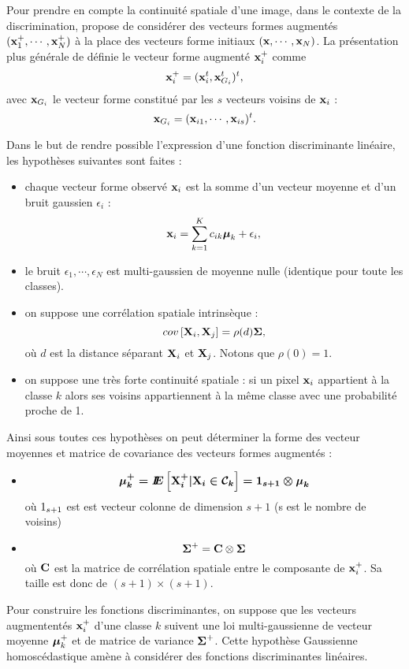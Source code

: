 %
%
%

Pour prendre en compte la continuit\'e spatiale
d'une image, dans le contexte de la  discrimination,  propose
de consid\'erer des vecteurs formes augment\'es $(\mbox{\bf x}_1^+,\cdots,\mbox{\bf x}_N^+)$
\`a la place des vecteurs forme initiaux $(\mbox{\bf x},\cdots,\mbox{\bf x}_N) $. La 
pr\'esentation plus g\'en\'erale de  d\'efinie
le vecteur forme augment\'e $\mbox{\bf x}_i^+$ comme
$$
\mbox{\bf x}_i^+=(\mbox{\bf x}_i^t,\mbox{\bf x}_{G_i}^t)^t,
$$
avec $\mbox{\bf x}_{G_i}$ le vecteur forme constitu\'e par les $s$ vecteurs voisins de $\mbox{\bf x}_i$ :
$$
\mbox{\bf x}_{G_i}=(\mbox{\bf x}_{i1},\cdots,\mbox{\bf x}_{is})^t.
$$


Dans le but de rendre possible l'expression d'une fonction discriminante lin\'eaire,
les hypoth\`eses suivantes sont faites :
\begin{itemize}
\item chaque vecteur forme observ\'e $\mbox{\bf x}_i$ est la somme d'un vecteur moyenne et 
d'un bruit gaussien $\epsilon_i$ :
$$
\mbox{\bf x}_i= \sum_{k=1}^K c_{ik} \mbox{\boldmath $\mu$}_k + \epsilon_i,
$$     
\item le bruit $\epsilon_1,\cdots,\epsilon_N$ est 
 multi-gaussien de moyenne nulle (identique pour toute les classes).
\item
on suppose une corr\'elation spatiale intrins\`eque :
$$
cov \left[ \mbox{\bf X}_i, \mbox{\bf X}_j  \right ] = \rho(d)\mbox{\boldmath $\Sigma$}, 
$$
o\`u $d$ est la distance s\'eparant $\mbox{\bf X}_i$ et $\mbox{\bf X}_j$. Notons
que $\rho(0)=1$.
\item
on suppose une tr\`es forte continuit\'e spatiale : si un pixel 
$\mbox{\bf x}_i$ appartient \`a la classe $k$ alors ses voisins appartiennent
\`a la m\^eme classe avec une probabilit\'e proche de 1. 
\end{itemize}
Ainsi  sous toutes ces hypoth\`eses on peut d\'eterminer la forme des vecteur moyennes
et matrice de covariance des vecteurs formes augment\'es :
\begin{itemize}
\item
$$
\mbox{\boldmath $\mu$}_k^+= I\!\!E \left[ \mbox{\bf X}_i^+  | \mbox{\bf X}_i \in {\cal C}_k \right]= \boldmath{1}_{s+1} \otimes \mbox{\boldmath $\mu$}_k
$$
o\`u $\boldmath{1}_{s+1}$ est est vecteur colonne de dimension $s+1$ (s est le nombre de
voisins)
\item
$$
\mbox{\boldmath $\Sigma$}^+ = \mbox{\bf C} \otimes \mbox{\boldmath $\Sigma$}
$$
o\`u $\mbox{\bf C}$ est la matrice de corr\'elation spatiale entre le composante de $\mbox{\bf x}_i^+$. Sa
taille est donc de $(s+1)\times(s+1)$. 
\end{itemize}

Pour construire les fonctions discriminantes, on suppose que les 
vecteurs augmentent\'es $\mbox{\bf x}_i^+$ d'une classe $k$ suivent une loi multi-gaussienne
de vecteur moyenne $\mbox{\boldmath $\mu$}_k^+$ et de matrice de variance $\mbox{\boldmath $\Sigma$}^+$. 
Cette hypoth\`ese Gaussienne homosc\'edastique am\`ene \`a consid\'erer des
fonctions discriminantes lin\'eaires.  


